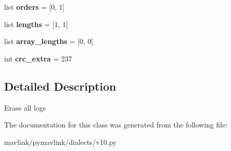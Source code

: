 \begin{DoxyCompactItemize}
\item 
\mbox{\label{classpymavlink_1_1dialects_1_1v10_1_1MAVLink__log__erase__message_aa5dc3f6a411d1b740ef61a7a9f1a881e}} 
list {\bfseries orders} = \mbox{[}0, 1\mbox{]}
\item 
\mbox{\label{classpymavlink_1_1dialects_1_1v10_1_1MAVLink__log__erase__message_ae4c319595a4b5fda6528fdbacf3564c3}} 
list {\bfseries lengths} = \mbox{[}1, 1\mbox{]}
\item 
\mbox{\label{classpymavlink_1_1dialects_1_1v10_1_1MAVLink__log__erase__message_ac4242e2a9d092f201a843b74ba594294}} 
list {\bfseries array\+\_\+lengths} = \mbox{[}0, 0\mbox{]}
\item 
\mbox{\label{classpymavlink_1_1dialects_1_1v10_1_1MAVLink__log__erase__message_ac872c22f66d10f5fc4064cf50d797dd7}} 
int {\bfseries crc\+\_\+extra} = 237
\end{DoxyCompactItemize}


\subsection{Detailed Description}
\begin{DoxyVerb}Erase all logs
\end{DoxyVerb}
 

The documentation for this class was generated from the following file\+:\begin{DoxyCompactItemize}
\item 
mavlink/pymavlink/dialects/v10.\+py\end{DoxyCompactItemize}
